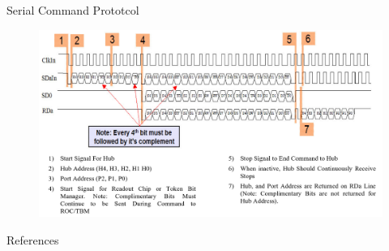 \documentclass{beamer}
\begin{document}
\begin{frame}{Serial Command Prototcol}
    \begin{figure}
        \includegraphics[width=1.02\textwidth]{"figures/SerialCommandWaveform"}
    \end{figure}
\end{frame}

\begin{frame}{References}
    \nocite{*}
    
    {\tiny
     
    }
\end{frame}
\end{document}
